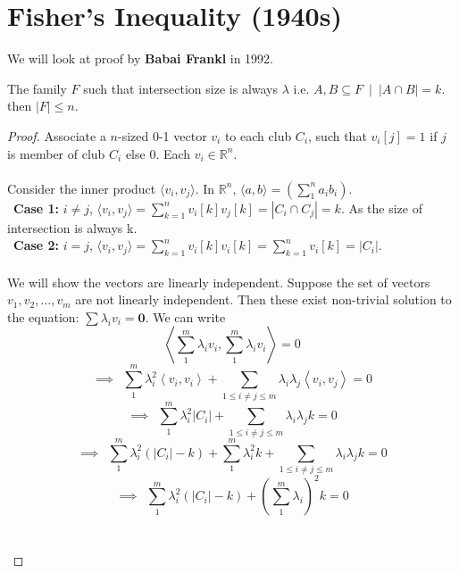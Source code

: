 \section{Fisher's Inequality (1940s)}
We will look at proof by \textbf{Babai Frankl} in 1992.
\begin{theorem}
The family $F$ such that intersection size is always $\lambda$ i.e. $A,B \subseteq F ~ \mid ~ |A \cap B|=k $. then $|F|\le n$.
\begin{proof}Associate a $n$-sized 0-1 vector $v_i$ to each club $C_i$, such that $v_i[j]=1$ if $j$ is member of club $C_i$ else 0. Each $v_i\in \mathbb{R}^n$.\\\\
Consider the inner product $\langle v_i,v_j\rangle$. In $\mathbb{R}^n$, $\langle a,b\rangle = (\sum_{1}^{n} a_ib_i)$.\\

~\textbf{Case 1:} $i\neq j$, $\langle v_i,v_j\rangle = \sum_{k=1}^{n} v_i[k]v_j[k] = | C_i \cap C_j | = k$. As the size of intersection is always k.\\

~\textbf{Case 2:} $i= j$, $\langle v_i,v_j\rangle = \sum_{k=1}^{n} v_i[k]v_i[k] = \sum_{k=1}^{n} v_i[k]= |C_i|$.\\\\
We will show the vectors are linearly independent. Suppose the set of vectors $v_1, v_2, \hdots, v_m$ are not linearly independent. Then these exist non-trivial solution to the equation: $\sum \lambda_i v_i=\textbf{0}$. We can write\\
$$ \left \langle \sum_1^m \lambda_i v_i,\sum_1^m \lambda_i v_i \right\rangle = 0$$
$$\implies ~~ \sum_1^m \lambda_i^2 \left \langle   v_i, v_i \right\rangle + \sum_{1\le i \neq j\le m} \lambda_i \lambda_j \left \langle   v_i, v_j \right\rangle = 0$$
$$\implies ~~ \sum_1^m \lambda_i^2 |C_i| + \sum_{1\le i \neq j\le m} \lambda_i \lambda_j k = 0$$
$$\implies ~~ \sum_1^m \lambda_i^2 (|C_i|-k) +\sum_1^m \lambda_i^2k + \sum_{1\le i \neq j\le m} \lambda_i \lambda_j k = 0$$
$$\implies ~~ \sum_1^m \lambda_i^2 (|C_i|-k) +(\sum_1^m \lambda_i)^2k = 0$$\\\\


\end{proof}
\end{theorem}

